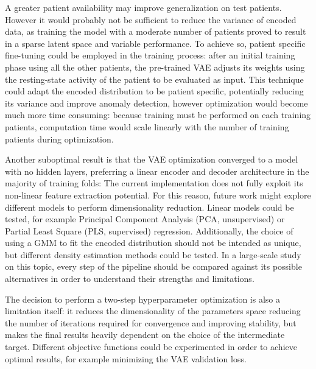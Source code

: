 A greater patient availability may improve generalization on test patients.
However it would probably not be sufficient to reduce the variance of encoded
data, as training the model with a moderate number of patients proved to result 
in a sparse latent space and variable performance.
To achieve so, patient specific fine-tuning could be employed in the training
process:
after an initial training phase using all the other patients, the pre-trained
VAE adjusts its weights using the resting-state activity of the patient to be
evaluated as input.
This technique could adapt the encoded distribution to be patient specific,
potentially reducing its variance and improve anomaly detection,
however optimization would become much more time consuming:
because training must be performed on each training patients, computation
time would scale linearly with the number of training patients during
optimization.

Another suboptimal result is that the VAE optimization converged to a model
with no hidden layers, preferring a linear encoder and decoder architecture
in the majority of training folds:
The current implementation does not fully exploit its non-linear feature
extraction potential.
For this reason, future work might explore different models to perform
dimensionality reduction.
Linear models could be tested, for example Principal Component Analysis (PCA,
unsupervised) or Partial Least Square (PLS, supervised) regression.
Additionally, the choice of using a GMM to fit the encoded distribution should
not be intended as unique, but different density estimation methods could be
tested.
In a large-scale study on this topic, every step of the pipeline should be
compared against its possible alternatives in order to understand their
strengths and limitations.

The decision to perform a two-step hyperparameter optimization is also a
limitation itself:
it reduces the dimensionality of the parameters space reducing the number of
iterations required for convergence and improving stability, but makes the
final results heavily dependent on the choice of the intermediate target. 
Different objective functions could be experimented in order to achieve
optimal results, for example minimizing the VAE validation loss.
